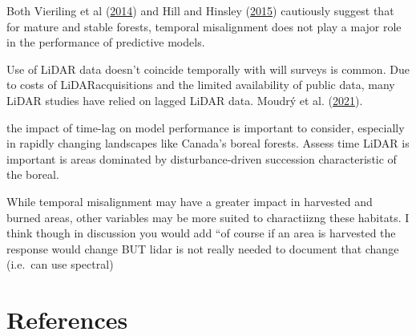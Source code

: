 \documentclass[
]{article}
\begin{document}
Both Vieriling et al (\protect\hyperlink{ref-VierlingSwift2014}{2014}) and Hill and Hinsley (\protect\hyperlink{ref-hillAirborneLidarWoodland2015}{2015}) cautiously suggest that for mature and stable forests, temporal misalignment does not play a major role in the performance of predictive models.

Use of LiDAR data doesn't coincide temporally with will surveys is common. Due to costs of LiDARacquisitions and the limited availability of public data, many LiDAR studies have relied on lagged LiDAR data. Moudrý et al. (\protect\hyperlink{ref-moudryRoleVegetationStructure2021}{2021}).

the impact of time-lag on model performance is important to consider, especially in rapidly changing landscapes like Canada's boreal forests. Assess time LiDAR is important is areas dominated by disturbance-driven succession characteristic of the boreal.

While temporal misalignment may have a greater impact in harvested and burned areas, other variables may be more suited to charactiizng these habitats. I think though in discussion you would add ``of course if an area is harvested the response would change BUT lidar is not really needed to document that change (i.e.~can use spectral)

\pagebreak

\hypertarget{references}{%
\section*{References}\label{references}}
\end{document}
